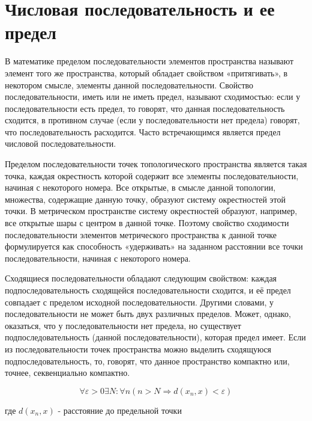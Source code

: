 \section{Числовая последовательность и ее предел}

В математике пределом последовательности элементов пространства называют элемент того же пространства, который обладает свойством «притягивать», в некотором смысле, элементы данной последовательности. Свойство последовательности, иметь или не иметь предел, называют сходимостью: если у последовательности есть предел, то говорят, что данная последовательность сходится, в противном случае (если у последовательности нет предела) говорят, что последовательность расходится. Часто встречающимся является предел числовой последовательности.

Пределом последовательности точек топологического пространства является такая точка, каждая окрестность которой содержит все элементы последовательности, начиная с некоторого номера. Все открытые, в смысле данной топологии, множества, содержащие данную точку, образуют систему окрестностей этой точки. В метрическом пространстве систему окрестностей образуют, например, все открытые шары с центром в данной точке. Поэтому свойство сходимости последовательности элементов метрического пространства к данной точке формулируется как способность «удерживать» на заданном расстоянии все точки последовательности, начиная с некоторого номера.

Сходящиеся последовательности обладают следующим свойством: каждая подпоследовательность сходящейся последовательности сходится, и её предел совпадает с пределом исходной последовательности. Другими словами, у последовательности не может быть двух различных пределов. Может, однако, оказаться, что у последовательности нет предела, но существует подпоследовательность (данной последовательности), которая предел имеет. Если из последовательности точек пространства можно выделить сходящуюся подпоследовательность, то, говорят, что данное пространство компактно или, точнее, секвенциально компактно.

$$
\forall \varepsilon > 0 \exists N: \forall n (n > N \Rightarrow d(x_n, x) < \varepsilon)
$$

где $d(x_n, x)$ - расстояние до предельной точки

